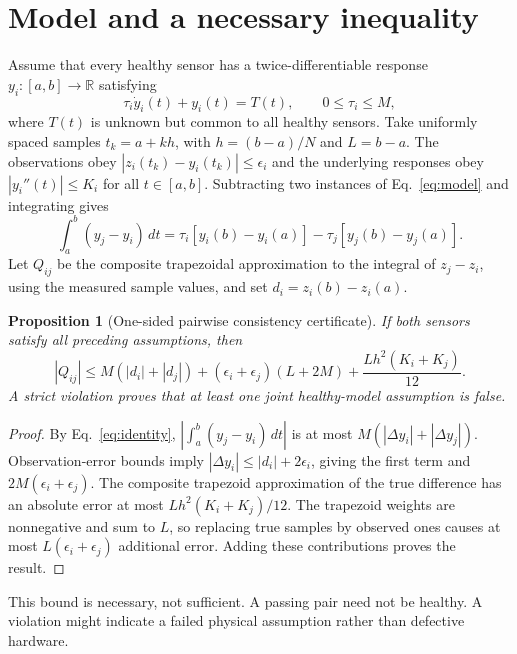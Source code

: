 \documentclass[11pt]{article}
\newtheorem{proposition}{Proposition}
\begin{document}
\section{Model and a necessary inequality}
Assume that every healthy sensor has a twice-differentiable response $y_i:[a,b]\to\mathbb{R}$ satisfying
\begin{equation}
\tau_i \dot y_i(t)+y_i(t)=T(t),\qquad 0\le \tau_i\le M,
\label{eq:model}
\end{equation}
where $T(t)$ is unknown but common to all healthy sensors. Take uniformly spaced samples $t_k=a+kh$, with $h=(b-a)/N$ and $L=b-a$. The observations obey $|z_i(t_k)-y_i(t_k)|\le \epsilon_i$ and the underlying responses obey $|y_i''(t)|\le K_i$ for all $t\in[a,b]$.
Subtracting two instances of Eq.~\eqref{eq:model} and integrating gives
\begin{equation}
\int_a^b(y_j-y_i)\,dt=\tau_i[y_i(b)-y_i(a)]-\tau_j[y_j(b)-y_j(a)].
\label{eq:identity}
\end{equation}
Let $Q_{ij}$ be the composite trapezoidal approximation to the integral of $z_j-z_i$, using the measured sample values, and set $d_i=z_i(b)-z_i(a)$.
\begin{proposition}[One-sided pairwise consistency certificate]
If both sensors satisfy all preceding assumptions, then
\begin{equation}
|Q_{ij}|\le M(|d_i|+|d_j|)+(\epsilon_i+\epsilon_j)(L+2M)+\frac{Lh^2(K_i+K_j)}{12}.
\label{eq:bound}
\end{equation}
A strict violation proves that at least one joint healthy-model assumption is false.
\end{proposition}
\begin{proof}
By Eq.~\eqref{eq:identity}, $|\int_a^b(y_j-y_i)\,dt|$ is at most $M(|\Delta y_i|+|\Delta y_j|)$. Observation-error bounds imply $|\Delta y_i|\le |d_i|+2\epsilon_i$, giving the first term and $2M(\epsilon_i+\epsilon_j)$. The composite trapezoid approximation of the true difference has an absolute error at most $Lh^2(K_i+K_j)/12$. The trapezoid weights are nonnegative and sum to $L$, so replacing true samples by observed ones causes at most $L(\epsilon_i+\epsilon_j)$ additional error. Adding these contributions proves the result.
\end{proof}
This bound is necessary, not sufficient. A passing pair need not be healthy. A violation might indicate a failed physical assumption rather than defective hardware.
\end{document}
